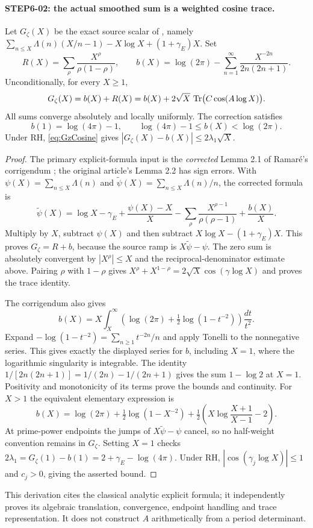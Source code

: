\paragraph{STEP6-02: the actual smoothed sum is a weighted cosine trace.}
Let $G_\zeta(X)$ be the exact source scalar of , namely
$\sum_{n\le X}\Lambda(n)(X/n-1)-X\log X+(1+\gamma_E)X$. Set
\[
 R(X)=\sum_\rho\frac{X^\rho}{\rho(1-\rho)},\qquad
 b(X)=\log(2\pi)-\sum_{n=1}^\infty\frac{X^{-2n}}{2n(2n+1)}.
\]
Unconditionally, for every $X\ge1$,
\begin{equation}\label{eq:GzCosine}
 G_\zeta(X)=b(X)+R(X)
 =b(X)+2\sqrt X\,\operatorname{Tr}\bigl(C\cos(A\log X)\bigr).
\end{equation}
All sums converge absolutely and locally uniformly. The correction satisfies
\[
 b(1)=\log(4\pi)-1,\qquad
 \log(4\pi)-1\le b(X)<\log(2\pi).
\]
Under RH, \eqref{eq:GzCosine} gives
$|G_\zeta(X)-b(X)|\le2\lambda_1\sqrt X$.
\begin{proof}
The primary explicit-formula input is the \emph{corrected} Lemma 2.1 of Ramar\'e's corrigendum \cite[pp.~1--2]{ramare}; the original article's Lemma 2.2 has sign errors. With $\psi(X)=\sum_{n\le X}\Lambda(n)$ and $\widetilde\psi(X)=\sum_{n\le X}\Lambda(n)/n$, the corrected formula is
\[
 \widetilde\psi(X)=\log X-\gamma_E+\frac{\psi(X)-X}{X}
 -\sum_\rho\frac{X^{\rho-1}}{\rho(\rho-1)}+\frac{b(X)}X.
\]
Multiply by $X$, subtract $\psi(X)$ and then subtract
$X\log X-(1+\gamma_E)X$. This proves $G_\zeta=R+b$, because the source ramp is $X\widetilde\psi-\psi$. The zero sum is absolutely convergent by $|X^\rho|\le X$ and the reciprocal-denominator estimate above. Pairing $\rho$ with $1-\rho$ gives
$X^\rho+X^{1-\rho}=2\sqrt X\cos(\gamma\log X)$ and proves the trace identity.

The corrigendum also gives
\[
 b(X)=X\int_X^\infty
 \left(\log(2\pi)+\tfrac12\log(1-t^{-2})\right)\frac{dt}{t^2}.
\]
Expand $-\log(1-t^{-2})=\sum_{n\ge1}t^{-2n}/n$ and apply Tonelli to the nonnegative series. This gives exactly the displayed series for $b$, including $X=1$, where the logarithmic singularity is integrable. The identity
$1/[2n(2n+1)]=1/(2n)-1/(2n+1)$ gives the sum $1-\log2$ at $X=1$. Positivity and monotonicity of its terms prove the bounds and continuity. For $X>1$ the equivalent elementary expression is
\[
 b(X)=\log(2\pi)+\tfrac12\log(1-X^{-2})
 +\tfrac12\left(X\log\frac{X+1}{X-1}-2\right).
\]
At prime-power endpoints the jumps of $X\widetilde\psi-\psi$ cancel, so no half-weight convention remains in $G_\zeta$. Setting $X=1$ checks
$2\lambda_1=G_\zeta(1)-b(1)=2+\gamma_E-\log(4\pi)$.
Under RH, $|\cos(\gamma_j\log X)|\le1$ and $c_j>0$, giving the asserted bound.
\end{proof}
This derivation cites the classical analytic explicit formula; it independently proves its algebraic translation, convergence, endpoint handling and trace representation. It does not construct $A$ arithmetically from a period determinant.

